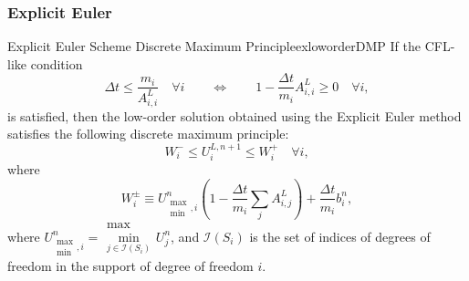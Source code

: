 \subsubsection{Explicit Euler}
\begin{theorem}{Explicit Euler Scheme Discrete Maximum Principle}{exloworderDMP}
If the CFL-like condition
\begin{equation}\label{ex_CFL}
   \Delta t \leq \frac{m_i}{A_{i,i}^L}\quad\forall i
   \qquad\Longleftrightarrow\qquad
   1 - \frac{\Delta t}{m_i}A_{i,i}^L \geq 0\quad\forall i,
\end{equation}
is satisfied, then the low-order solution obtained using the Explicit Euler
method satisfies the following discrete maximum principle:
\begin{equation}\label{explicit_max_principle}
   W_i^-\leq U_i^{L,n+1}\leq W_i^+\quad\forall i,
\end{equation}
where
\begin{equation}\label{ex_bounds}
   W_i^\pm\equiv U_{\substack{\max\\\min},i}^n\left(1-\frac{\Delta t}{m_i}
      \sum\limits_j A^L_{i,j}\right)
      + \frac{\Delta t}{m_i}b_i^n,
\end{equation}
where $U_{\substack{\max\\\min},i}^n =
\substack{\max\\\min\limits_{j\in \mathcal{I}(S_i)}}U_j^n$,
and $\mathcal{I}(S_i)$ is the set of indices of degrees of freedom in the
support of degree of freedom $i$.
\end{theorem}

